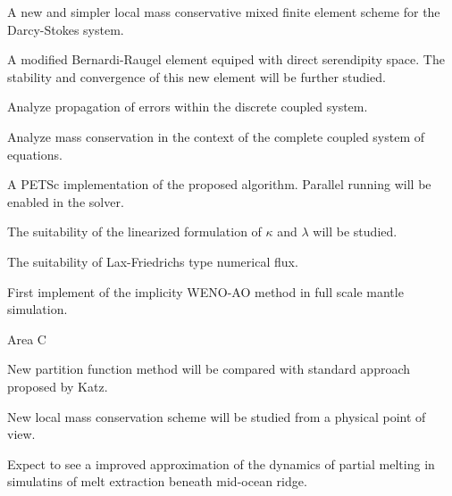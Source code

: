 \documentclass[usenames,dvipsnames,letterpaper,landscape,final]{slides}
\begin{document}
\begin{myslideNoFooter}
\begin{blist}
\item {}
\begin{nlist}
\item A new and simpler local mass conservative mixed finite element scheme for the Darcy-Stokes system.
\item A modified Bernardi-Raugel element equiped with direct serendipity space. The stability and convergence
of this new element will be further studied.
\item Analyze propagation of errors within the discrete coupled system.
\item Analyze mass conservation in the context of the complete coupled system of equations.
\end{nlist}
\item {}
\begin{nlist}
\item A PETSc implementation of the proposed algorithm. Parallel running will be enabled in the solver.
\item The suitability of the linearized formulation of $\kappa$  and $\lambda$ will be studied.
\item The suitability of Lax-Friedrichs type numerical flux.
\item First implement of the implicity WENO-AO method in full scale mantle simulation.
\end{nlist}
\end{blist}
\end{myslideNoFooter}

\begin{myslideNoFooter}
\begin{blist}
\item Area C
\begin{nlist}
\item New partition function method will be compared with standard approach proposed by Katz.
\item New local mass conservation scheme will be studied from a physical point of view.
\item Expect to see a improved approximation of the dynamics of partial melting in simulatins of 
melt extraction beneath mid-ocean ridge.
\end{nlist}
\end{blist}
\end{myslideNoFooter}

\end{document}
